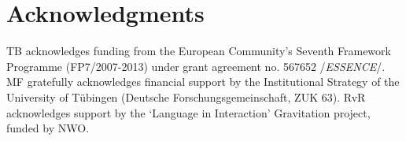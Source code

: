 \documentclass[10pt,a4paper]{article}
\begin{document}
\section{Acknowledgments}
TB acknowledges funding from the European Community's Seventh Framework Programme (FP7/2007-2013) under grant agreement no. 567652 /{\em ESSENCE}/. MF gratefully acknowledges financial support by the Institutional Strategy of the University of T\"ubingen (Deutsche Forschungsgemeinschaft, ZUK 63). RvR acknowledges support by the `Language in Interaction' Gravitation project, funded by NWO.


%



\setlength{\bibleftmargin}{.125in}
\setlength{\bibindent}{-\bibleftmargin}

\end{document}
